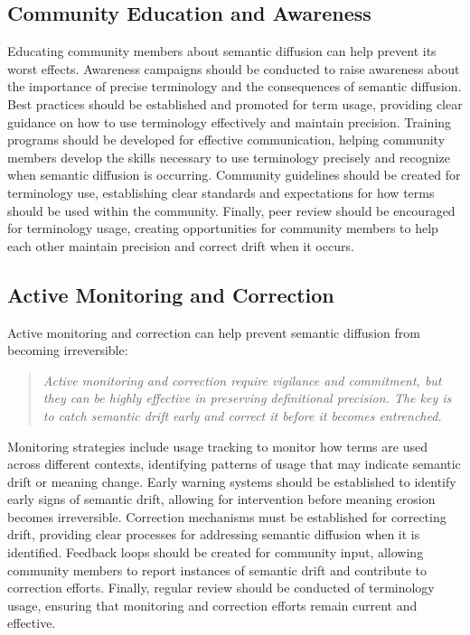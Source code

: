 \documentclass[11pt]{article}
\begin{document}
\subsection{Community Education and Awareness}

Educating community members about semantic diffusion can help prevent its worst effects. Awareness campaigns should be conducted to raise awareness about the importance of precise terminology and the consequences of semantic diffusion. Best practices should be established and promoted for term usage, providing clear guidance on how to use terminology effectively and maintain precision. Training programs should be developed for effective communication, helping community members develop the skills necessary to use terminology precisely and recognize when semantic diffusion is occurring. Community guidelines should be created for terminology use, establishing clear standards and expectations for how terms should be used within the community. Finally, peer review should be encouraged for terminology usage, creating opportunities for community members to help each other maintain precision and correct drift when it occurs.

\subsection{Active Monitoring and Correction}

Active monitoring and correction can help prevent semantic diffusion from becoming irreversible:

\begin{quote}
\emph{Active monitoring and correction require vigilance and commitment, but they can be highly effective in preserving definitional precision. The key is to catch semantic drift early and correct it before it becomes entrenched.}
\end{quote}

Monitoring strategies include usage tracking to monitor how terms are used across different contexts, identifying patterns of usage that may indicate semantic drift or meaning change. Early warning systems should be established to identify early signs of semantic drift, allowing for intervention before meaning erosion becomes irreversible. Correction mechanisms must be established for correcting drift, providing clear processes for addressing semantic diffusion when it is identified. Feedback loops should be created for community input, allowing community members to report instances of semantic drift and contribute to correction efforts. Finally, regular review should be conducted of terminology usage, ensuring that monitoring and correction efforts remain current and effective.
\end{document}

